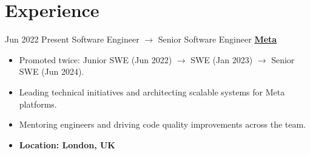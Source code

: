 \documentclass[letterpaper]{twentysecondcv} %
\begin{document}
    \section{Experience}
    \begin{twenty} %
        \twentyitem
      		{Jun 2022}
    		{Present}
            {Software Engineer $\rightarrow$ Senior Software Engineer}
            {\large\textbf{\href{https://about.meta.com/}{Meta}}}
            {
                \begin{itemize}
                    \item Promoted twice: Junior SWE (Jun 2022) $\rightarrow$ SWE (Jan 2023) $\rightarrow$ Senior SWE (Jun 2024).
                    \item Leading technical initiatives and architecting scalable systems for Meta platforms.
                    \item Mentoring engineers and driving code quality improvements across the team.
                    \item \textbf{Location: London, UK}
                \end{itemize}
            }
            {\\}

\end{twenty}
\end{document}
